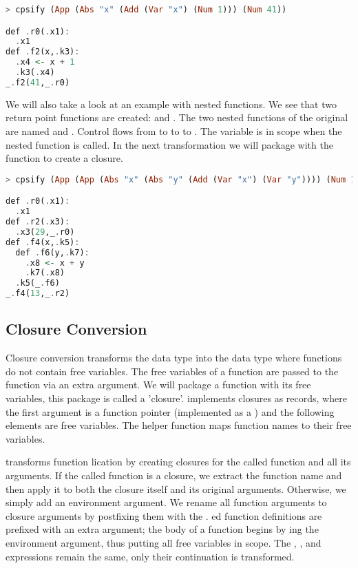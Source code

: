 {\begin{lstlisting}[language=Haskell]
> cpsify (App (Abs "x" (Add (Var "x") (Num 1))) (Num 41))

def .r0(.x1):
  .x1
def .f2(x,.k3):
  .x4 <- x + 1
  .k3(.x4)
_.f2(41,_.r0)
\end{lstlisting}

We will also take a look at an example with nested functions. We see that two return point functions are created:  and . The two nested functions of the original  are named  and . Control flows from  to  to  to . The variable  is in scope when the nested function  is called. In the next transformation we will package  with the function  to create a closure.

\begin{lstlisting}[language=Haskell]
> cpsify (App (App (Abs "x" (Abs "y" (Add (Var "x") (Var "y")))) (Num 13)) (Num 29))

def .r0(.x1):
  .x1
def .r2(.x3):
  .x3(29,_.r0)
def .f4(x,.k5):
  def .f6(y,.k7):
    .x8 <- x + y
    .k7(.x8)
  .k5(_.f6)
_.f4(13,_.r2)
\end{lstlisting}

\subsection{\label{section:closconvert}Closure Conversion}
Closure conversion transforms the  data type into the  data type where functions do not contain free variables. The free variables of a function are passed to the function via an extra argument. We will package a function with its free variables, this package is called a 'closure'.  implements closures as records, where the first argument is a function pointer (implemented as a ) and the following elements are free variables. The helper function  maps function names to their free variables.

 transforms function lication by creating closures for the called function and all its arguments. If the called function is a closure, we extract the function name and then apply it to both the closure itself and its original arguments. Otherwise, we simply add an environment argument. We rename all function arguments to closure arguments by postfixing them with the . ed function definitions are prefixed with an extra  argument; the body of a function begins by ing the environment argument, thus putting all free variables in scope. The , , and  expressions remain the same, only their continuation is transformed.

}
